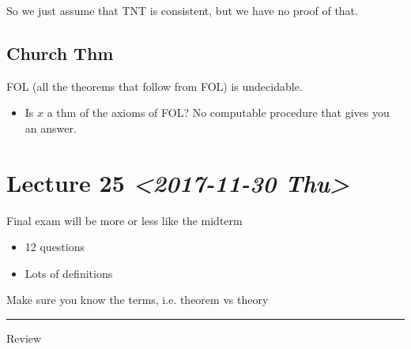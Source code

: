 \documentclass[11pt]{article}
\begin{document}
So we just assume that TNT is consistent, but we have no proof of that.
\subsection{Church Thm}
\label{sec:orge75cc26}
FOL (all the theorems that follow from FOL) is undecidable.
\begin{itemize}
\item Is \(x\) a thm of the axioms of FOL? No computable procedure that gives you an answer.
\end{itemize}
\section{Lecture 25 \textit{<2017-11-30 Thu>}}
\label{sec:org24dd58c}
Final exam will be more or less like the midterm
\begin{itemize}
\item 12 questions
\item Lots of definitions
\end{itemize}
Make sure you know the terms, i.e. theorem vs theory

\noindent\rule{\textwidth}{0.5pt}
Review
\end{document}
